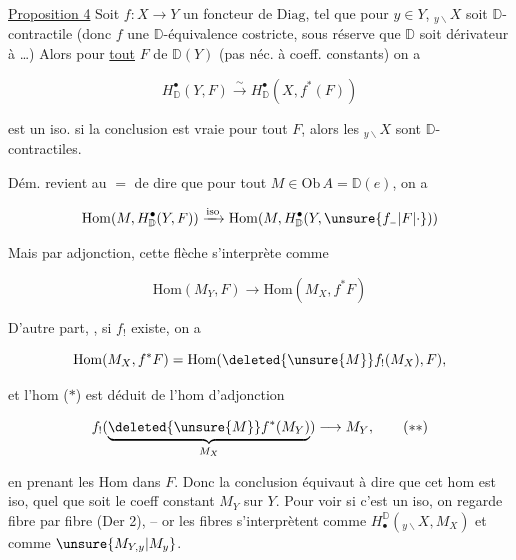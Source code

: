 
 

\uline{Proposition 4}  Soit $f:X\longrightarrow Y$ un foncteur de $\mathrm{Diag}$, tel que pour $y\in Y$, $ {}_{y\backslash}X$ soit $\mathbb D$-contractile (donc $f$ une $\mathbb D$-équivalence costricte, sous réserve que $\mathbb D$ soit dérivateur à  \ldots) Alors pour \uline{tout} $F$ de $\mathbb D(Y)$ (pas néc. à coeff. constants) on a

\[ H^\bullet_{\mathbb D}(Y,F)\xrightarrow{\sim}H^\bullet_{\mathbb D}(X,f^*(F)) \]

est un iso.  si la conclusion est vraie pour tout $F$, alors  les $ {}_{y\backslash}X$ sont $\mathbb D$-contractiles.

Dém.  revient au $=$ de dire que pour tout $M\in\mathrm{Ob}\,A=\mathbb D(e)$, on a

\[ \mathrm{Hom}(M,H^\bullet_{\mathbb D}(Y,F))\xrightarrow{\mathrm{iso}}\mathrm{Hom}(M,H^\bullet_{\mathbb D}(Y,\unsure{f_{\scriptscriptstyle -}|F|\cdot})) \]


Mais par adjonction, cette flèche s'interprète comme

\[ \mathrm{Hom}(M_Y,F)\longrightarrow\mathrm{Hom}(M_X,f^*F)\tag*{($*$)} \]

D'autre part, , si $f_!$ existe, on a

\[ \mathrm{Hom}(M_X,f^*F)=\mathrm{Hom}(\deleted{\unsure{M}}f_!(M_X),F), \]

et l'hom ($*$) est déduit de l'hom d'adjonction

\[ f_!(\underbrace{\deleted{\unsure{M}}f^*(M_Y)}_{M_X})\longrightarrow M_Y,\tag*{($**$)} \]

en prenant les Hom dans $F$. Donc la conclusion équivaut à dire que cet hom est iso, quel que soit  le  coeff constant $M_Y$ sur $Y$. Pour voir si c'est un iso, on regarde fibre par fibre (Der 2), -- or les fibres s'interprètent comme $H_\bullet^{\mathbb D}({}_{y\backslash}X,M_X)$  et comme $\unsure{M_{Y,y}|M_y}$.
